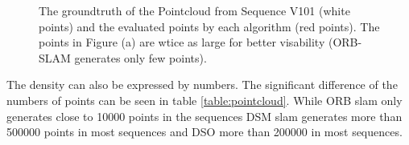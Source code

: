 	\begin{figure}%
    \centering
    \qquad
	\qquad
    \caption{The groundtruth of the Pointcloud from Sequence V101 (white points) and the evaluated points by each algorithm (red points). 
	The points in Figure (a) are wtice as large for better visability (ORB-SLAM generates only few points). 
	}%
    \label{fig:pointcloud}%
	\end{figure}
	
	
	The density can also be expressed by numbers. The significant difference of the numbers of points can be seen in table \ref{table:pointcloud}. While 
	ORB slam only generates close to 10000 points in the sequences DSM slam generates more than 500000 points in most sequences and DSO more than 200000 
	in most sequences. 
	

